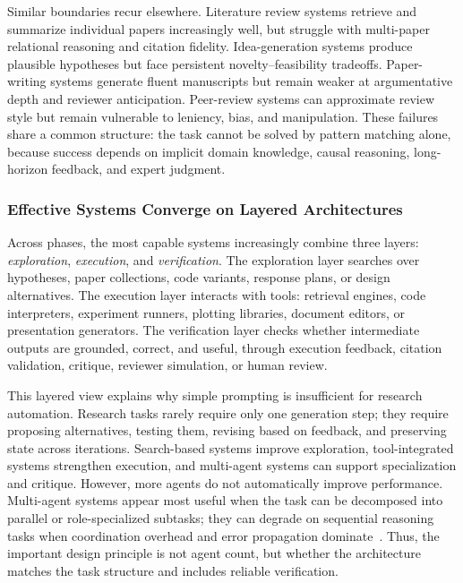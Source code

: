 \documentclass{llmxive}
\begin{document}
Similar boundaries recur elsewhere. Literature review systems retrieve and summarize individual papers increasingly well, but struggle with multi-paper relational reasoning and citation fidelity. Idea-generation systems produce plausible hypotheses but face persistent novelty--feasibility tradeoffs. Paper-writing systems generate fluent manuscripts but remain weaker at argumentative depth and reviewer anticipation. Peer-review systems can approximate review style but remain vulnerable to leniency, bias, and manipulation. These failures share a common structure: the task cannot be solved by pattern matching alone, because success depends on implicit domain knowledge, causal reasoning, long-horizon feedback, and expert judgment.


\subsubsection{Effective Systems Converge on Layered Architectures}
\label{sec:insight_architecture}

Across phases, the most capable systems increasingly combine three layers: \emph{exploration}, \emph{execution}, and \emph{verification}. The exploration layer searches over hypotheses, paper collections, code variants, response plans, or design alternatives. The execution layer interacts with tools: retrieval engines, code interpreters, experiment runners, plotting libraries, document editors, or presentation generators. The verification layer checks whether intermediate outputs are grounded, correct, and useful, through execution feedback, citation validation, critique, reviewer simulation, or human review.

This layered view explains why simple prompting is insufficient for research automation. Research tasks rarely require only one generation step; they require proposing alternatives, testing them, revising based on feedback, and preserving state across iterations. Search-based systems improve exploration, tool-integrated systems strengthen execution, and multi-agent systems can support specialization and critique. However, more agents do not automatically improve performance. Multi-agent systems appear most useful when the task can be decomposed into parallel or role-specialized subtasks; they can degrade on sequential reasoning tasks when coordination overhead and error propagation dominate~\cite{googlemit2025scaling}. Thus, the important design principle is not agent count, but whether the architecture matches the task structure and includes reliable verification.
\end{document}
